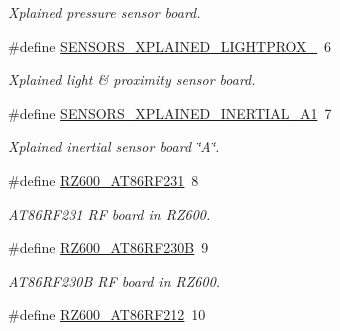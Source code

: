 \begin{DoxyCompactItemize}
\begin{DoxyCompactList}\small\item\em Xplained pressure sensor board. \end{DoxyCompactList}\item 
\hypertarget{group__group__common__boards_ga0a1006037bf18d016accfdea4a1105ae}{}\#define \hyperlink{group__group__common__boards_ga0a1006037bf18d016accfdea4a1105ae}{S\+E\+N\+S\+O\+R\+S\+\_\+\+X\+P\+L\+A\+I\+N\+E\+D\+\_\+\+L\+I\+G\+H\+T\+P\+R\+O\+X\+\_}~6\label{group__group__common__boards_ga0a1006037bf18d016accfdea4a1105ae}

\begin{DoxyCompactList}\small\item\em Xplained light \& proximity sensor board. \end{DoxyCompactList}\item 
\hypertarget{group__group__common__boards_ga7796d1fa6e31b50714c391877e095801}{}\#define \hyperlink{group__group__common__boards_ga7796d1fa6e31b50714c391877e095801}{S\+E\+N\+S\+O\+R\+S\+\_\+\+X\+P\+L\+A\+I\+N\+E\+D\+\_\+\+I\+N\+E\+R\+T\+I\+A\+L\+\_\+\+A1}~7\label{group__group__common__boards_ga7796d1fa6e31b50714c391877e095801}

\begin{DoxyCompactList}\small\item\em Xplained inertial sensor board \char`\"{}\+A\char`\"{}. \end{DoxyCompactList}\item 
\hypertarget{group__group__common__boards_gab07c6fafd717c9bf1fcf482710a10f9d}{}\#define \hyperlink{group__group__common__boards_gab07c6fafd717c9bf1fcf482710a10f9d}{R\+Z600\+\_\+\+A\+T86\+R\+F231}~8\label{group__group__common__boards_gab07c6fafd717c9bf1fcf482710a10f9d}

\begin{DoxyCompactList}\small\item\em A\+T86\+R\+F231 R\+F board in R\+Z600. \end{DoxyCompactList}\item 
\hypertarget{group__group__common__boards_gabfbfb1013bb6a4eb8f445c7e06af3178}{}\#define \hyperlink{group__group__common__boards_gabfbfb1013bb6a4eb8f445c7e06af3178}{R\+Z600\+\_\+\+A\+T86\+R\+F230\+B}~9\label{group__group__common__boards_gabfbfb1013bb6a4eb8f445c7e06af3178}

\begin{DoxyCompactList}\small\item\em A\+T86\+R\+F230\+B R\+F board in R\+Z600. \end{DoxyCompactList}\item 
\hypertarget{group__group__common__boards_ga06539607f7c8a0104557c4b4cc7ac175}{}\#define \hyperlink{group__group__common__boards_ga06539607f7c8a0104557c4b4cc7ac175}{R\+Z600\+\_\+\+A\+T86\+R\+F212}~10\label{group__group__common__boards_ga06539607f7c8a0104557c4b4cc7ac175}


\end{DoxyCompactItemize}

